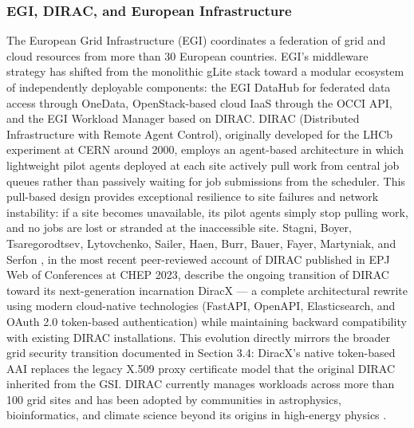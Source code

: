 \documentclass[12pt,a4paper]{report}
\begin{document}
  \subsubsection*{EGI, DIRAC, and European Infrastructure}
  The European Grid Infrastructure (EGI) coordinates a federation of grid and cloud resources from more than 30 European countries. 
  EGI’s middleware strategy has shifted from the monolithic gLite stack toward a modular ecosystem of independently deployable components:
   the EGI DataHub for federated data access through OneData, OpenStack-based cloud IaaS through the OCCI API, and the EGI Workload Manager 
   based on DIRAC. DIRAC (Distributed Infrastructure with Remote Agent Control), originally developed for the LHCb experiment at CERN 
   around 2000, employs an agent-based architecture in which lightweight pilot agents deployed at each site actively pull work from central 
   job queues rather than passively waiting for job submissions from the scheduler. This pull-based design provides exceptional resilience 
   to site failures and network instability: if a site becomes unavailable, its pilot agents simply stop pulling work, and no jobs are lost 
   or stranded at the inaccessible site. Stagni, Boyer, Tsaregorodtsev, Lytovchenko, Sailer, Haen, Burr, Bauer, Fayer, Martyniak, and Serfon \parencite{stagni2024dirac},
    in the most recent peer-reviewed account of DIRAC published in EPJ Web of Conferences at CHEP 2023, describe the ongoing transition of DIRAC 
    toward its next-generation incarnation DiracX — a complete architectural rewrite using modern cloud-native technologies 
    (FastAPI, OpenAPI, Elasticsearch, and OAuth 2.0 token-based authentication) while maintaining backward compatibility with existing DIRAC 
    installations. This evolution directly mirrors the broader grid security transition documented in Section 3.4: DiracX’s native token-based AAI 
    replaces the legacy X.509 proxy certificate model that the original DIRAC inherited from the GSI. DIRAC currently manages workloads across more 
    than 100 grid sites and has been adopted by communities in astrophysics, bioinformatics, and climate science beyond its origins in high-energy
    physics \parencite{stagni2024dirac}.
\end{document}
